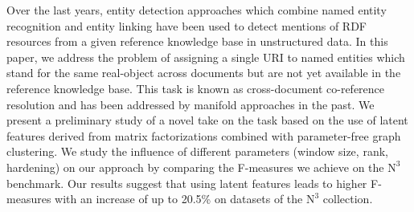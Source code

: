 Over the last years, entity detection approaches which combine named entity recognition and entity linking have been used to detect mentions of RDF resources from a given reference knowledge base in unstructured data. In this paper, we address the problem of assigning a single URI to named entities which stand for the same real-object across documents but are not yet available in the reference knowledge base. This task is known as cross-document co-reference resolution and has been addressed by manifold approaches in the past. We present a preliminary study of a novel take on the task based on the use of latent features derived from matrix factorizations combined with parameter-free graph clustering. 
We study the influence of different parameters (window size, rank, hardening) on our approach by comparing the F-measures we achieve on the $\mbox{N}^3$ benchmark.
Our results suggest that using latent features leads to higher F-measures with an increase of up to 20.5\% on datasets of the $\mbox{N}^3$ collection.


